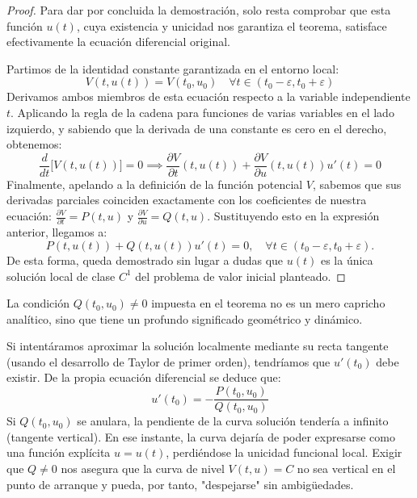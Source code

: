 \begin{proof}
    Para dar por concluida la demostración, solo resta comprobar que esta función $u(t)$, cuya existencia y unicidad nos garantiza el teorema, satisface efectivamente la ecuación diferencial original. 
    
    Partimos de la identidad constante garantizada en el entorno local:
    \[
        V(t, u(t)) = V(t_0, u_0) \quad \forall t \in (t_0 - \varepsilon, t_0 + \varepsilon)
    \]
    Derivamos ambos miembros de esta ecuación respecto a la variable independiente $t$. Aplicando la regla de la cadena para funciones de varias variables en el lado izquierdo, y sabiendo que la derivada de una constante es cero en el derecho, obtenemos:
    \[
        \frac{d}{dt} \Big[ V(t, u(t)) \Big] = 0 \implies \frac{\partial V}{\partial t} (t,u(t)) + \frac{\partial V}{\partial u} (t,u(t)) u'(t) = 0
    \]
    Finalmente, apelando a la definición de la función potencial $V$, sabemos que sus derivadas parciales coinciden exactamente con los coeficientes de nuestra ecuación: $\frac{\partial V}{\partial t} = P(t,u)$ y $\frac{\partial V}{\partial u} = Q(t,u)$. Sustituyendo esto en la expresión anterior, llegamos a:
    \[
        P(t, u(t)) + Q(t, u(t)) u'(t) = 0, \quad \forall t \in (t_0 - \varepsilon, t_0 + \varepsilon).
    \]
    De esta forma, queda demostrado sin lugar a dudas que $u(t)$ es la única solución local de clase $C^1$ del problema de valor inicial planteado.
\end{proof}

\begin{observación}
    La condición $Q(t_0, u_0) \neq 0$ impuesta en el teorema no es un mero capricho analítico, sino que tiene un profundo significado geométrico y dinámico. 
    
    Si intentáramos aproximar la solución localmente mediante su recta tangente (usando el desarrollo de Taylor de primer orden), tendríamos que $u'(t_0)$ debe existir. De la propia ecuación diferencial se deduce que:
    \[
        u'(t_0) = -\frac{P(t_0, u_0)}{Q(t_0, u_0)}
    \]
    Si $Q(t_0, u_0)$ se anulara, la pendiente de la curva solución tendería a infinito (tangente vertical). En ese instante, la curva dejaría de poder expresarse como una función explícita $u = u(t)$, perdiéndose la unicidad funcional local. Exigir que $Q \neq 0$ nos asegura que la curva de nivel $V(t,u) = C$ no sea vertical en el punto de arranque y pueda, por tanto, "despejarse" sin ambigüedades.
\end{observación}


